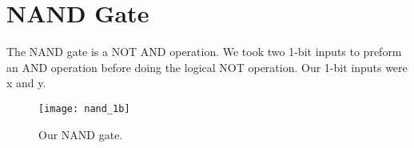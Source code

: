 \documentclass[
	letterpaper, %
	10pt, %
]{CSUniSchoolLabReport}
\begin{document}
 

\section{NAND Gate}
The NAND gate is a NOT AND operation. We took two 1-bit inputs to preform an AND operation before doing the logical NOT operation. Our 1-bit inputs were x and y.

\begin{figure}[H] %
	\texttt{[image: nand\_1b]} %
	\caption{Our NAND gate.}
\end{figure}
\end{document}
